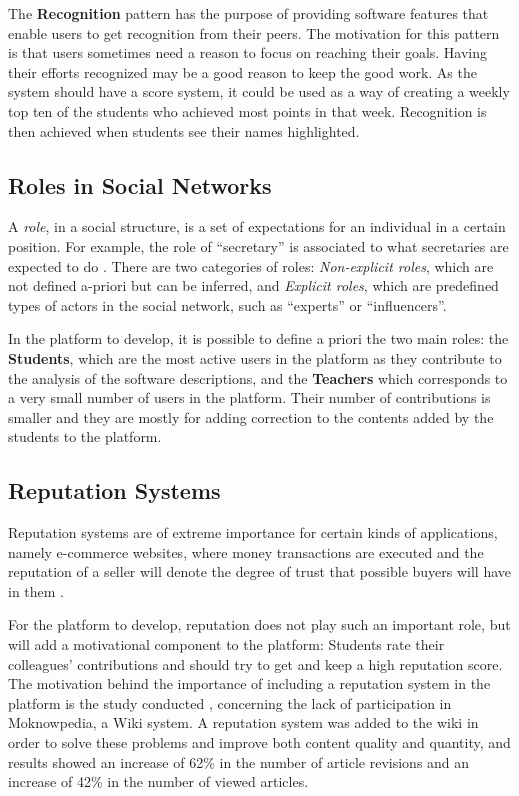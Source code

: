 \documentclass[conference]{IEEEtran}
\begin{document}
The \textbf{Recognition} pattern has the purpose of providing software features that enable users to get recognition from their peers. The motivation for this pattern is that users sometimes need a reason to focus on reaching their goals. Having their efforts recognized may be a good reason to keep the good work\cite{oduor2014persuasive}. As the system should have a score system, it could be used as a way of creating a weekly top ten of the students who achieved most points in that week. Recognition is then achieved when students see their names highlighted.

\subsection{Roles in Social Networks}
A \textit{role}, in a social structure, is a set of expectations for an individual in a certain position. For example, the role of ``secretary'' is associated to what secretaries are expected to do \cite{forestier2012roles,nadel1957theory}. There are two categories of roles: \textit{Non-explicit roles}, which are not defined a-priori but can be inferred, and \textit{Explicit roles}, which are predefined types of actors in the social network, such as ``experts'' or ``influencers''.

In the platform to develop, it is possible to define a priori the two main roles: the \textbf{Students}, which are the most active users in the platform as they contribute to the analysis of the software descriptions, and the \textbf{Teachers} which corresponds to a very small number of users in the platform. Their number of contributions is smaller and they are mostly for adding correction to the contents added by the students to the platform.

\subsection{Reputation Systems}
\label{relatedWorkRepsys}
Reputation systems are of extreme importance for certain kinds of applications, namely e-commerce websites, where money transactions are executed and the reputation of a seller will denote the degree of trust that possible buyers will have in them \cite{vavilis2014reference}.

For the platform to develop, reputation does not play such an important role, but will add a motivational component to the platform: Students rate their colleagues' contributions and should try to get and keep a high reputation score. The motivation behind the importance of including a reputation system in the platform is the study conducted \cite{dencheva2011dynamic}, concerning the lack of participation in Moknowpedia, a Wiki system. A reputation system was added to the wiki in order to solve these problems and improve both content quality and quantity\cite{prause2008approach}, and results showed an increase of 62\% in the number of article revisions and an increase of 42\% in the number of viewed articles.
	
\end{document}
